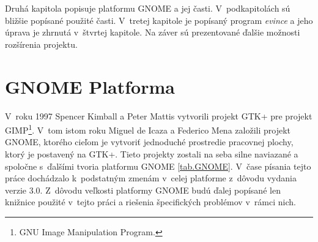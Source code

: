 \documentclass[12pt,oneside,final]{fithesis2}
\begin{document}
Druhá kapitola popisuje platformu GNOME a jej časti. V~podkapitolách sú bližšie popísané použité časti. V~tretej kapitole je popísaný program \emph{evince} a jeho úprava je zhrnutá v~štvrtej kapitole. Na záver sú prezentované ďalšie možnosti rozšírenia projektu.

\chapter{GNOME Platforma}
V~roku 1997 Spencer Kimball a Peter Mattis vytvorili projekt GTK+ pre projekt GIMP\footnote{GNU Image Manipulation Program.}. V~tom istom roku Miguel de Icaza a Federico Mena založili projekt GNOME, ktorého cieľom je vytvoriť jednoduché prostredie pracovnej plochy, ktorý je postavený na GTK+. Tieto projekty zostali na seba silne naviazané a spoločne s~ďalšími tvoria platformu GNOME \ref{tab.GNOME}. V~čase písania tejto práce dochádzalo k~podstatným zmenám v~celej platforme z~dôvodu vydania verzie 3.0. Z~dôvodu veľkosti platformy GNOME budú ďalej popísané len knižnice použité v~tejto práci a riešenia špecifických problémov v~rámci nich.
\end{document}
